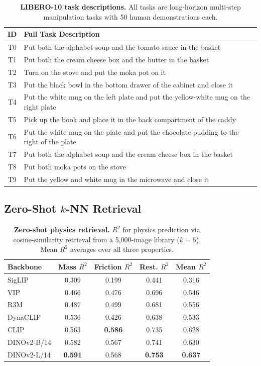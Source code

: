 \documentclass{article}
\newcommand{\methodname}{DynaCLIP}
\newcommand{\best}[1]{\textbf{#1}}
\begin{document}
\begin{table}[h]
\centering
\caption{\textbf{LIBERO-10 task descriptions.} All tasks are long-horizon multi-step manipulation tasks with 50 human demonstrations each.}
\label{tab:libero_tasks}
\small
\begin{tabular}{@{}cl@{}}
\toprule
\textbf{ID} & \textbf{Full Task Description} \\
\midrule
T0 & Put both the alphabet soup and the tomato sauce in the basket \\
T1 & Put both the cream cheese box and the butter in the basket \\
T2 & Turn on the stove and put the moka pot on it \\
T3 & Put the black bowl in the bottom drawer of the cabinet and close it \\
T4 & Put the white mug on the left plate and put the yellow-white mug on the right plate \\
T5 & Pick up the book and place it in the back compartment of the caddy \\
T6 & Put the white mug on the plate and put the chocolate pudding to the right of the plate \\
T7 & Put both the alphabet soup and the cream cheese box in the basket \\
T8 & Put both moka pots on the stove \\
T9 & Put the yellow and white mug in the microwave and close it \\
\bottomrule
\end{tabular}
\end{table}


\subsection{Zero-Shot $k$-NN Retrieval}
\label{app:zeroshot}

\begin{table}[h]
\centering
\caption{\textbf{Zero-shot physics retrieval.} $R^2$ for physics prediction via cosine-similarity retrieval from a 5,000-image library ($k{=}5$). Mean $R^2$ averages over all three properties.}
\label{tab:zeroshot}
\small
\begin{tabular}{@{}lcccc@{}}
\toprule
\textbf{Backbone} & \textbf{Mass $R^2$} & \textbf{Friction $R^2$} & \textbf{Rest. $R^2$} & \textbf{Mean $R^2$} \\
\midrule
SigLIP       & 0.309 & 0.199 & 0.441 & 0.316 \\
VIP          & 0.466 & 0.476 & 0.696 & 0.546 \\
R3M          & 0.487 & 0.499 & 0.681 & 0.556 \\
\methodname{} & 0.536 & 0.426 & 0.638 & 0.533 \\
CLIP         & 0.563 & \best{0.586} & 0.735 & 0.628 \\
DINOv2-B/14  & 0.582 & 0.567 & 0.741 & 0.630 \\
DINOv2-L/14  & \best{0.591} & 0.568 & \best{0.753} & \best{0.637} \\
\bottomrule
\end{tabular}
\end{table}
\end{document}
